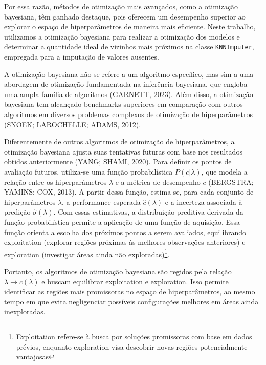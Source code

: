 \documentclass[
  12pt,
  a4paper,
]{scrreprt}
\begin{document}
\vspace{12pt}

Por essa razão, métodos de otimização mais avançados, como a otimização
bayesiana, têm ganhado destaque, pois oferecem um desempenho superior ao
explorar o espaço de hiperparâmetros de maneira mais eficiente. Neste
trabalho, utilizamos a otimização bayesiana para realizar a otimização
dos modelos e determinar a quantidade ideal de vizinhos mais próximos na
classe \texttt{KNNImputer}, empregada para a imputação de valores
ausentes.

\vspace{12pt}

A otimização bayesiana não se refere a um algoritmo específico, mas sim
a uma abordagem de otimização fundamentada na inferência bayesiana, que
engloba uma ampla família de algoritmos (GARNETT, 2023). Além disso, a
otimização bayesiana tem alcançado benchmarks superiores em comparação
com outros algoritmos em diversos problemas complexos de otimização de
hiperparâmetros (SNOEK; LAROCHELLE; ADAMS, 2012).

\vspace{12pt}

Diferentemente de outros algoritmos de otimização de hiperparâmetros, a
otimização bayesiana ajusta suas tentativas futuras com base nos
resultados obtidos anteriormente (YANG; SHAMI, 2020). Para definir os
pontos de avaliação futuros, utiliza-se uma função probabilística
\(P\left(c | \lambda \right)\), que modela a relação entre os
hiperparâmetros \(\lambda\) e a métrica de desempenho \(c\) (BERGSTRA;
YAMINS; COX, 2013). A partir dessa função, estima-se, para cada conjunto
de hiperparâmetros \(\lambda\), a performance esperada
\(\hat{c}\left(\lambda\right)\) e a incerteza associada à predição
\(\hat{\sigma}\left(\lambda\right)\). Com essas estimativas, a
distribuição preditiva derivada da função probabilística permite a
aplicação de uma função de aquisição. Essa função orienta a escolha dos
próximos pontos a serem avaliados, equilibrando exploitation (explorar
regiões próximas às melhores observações anteriores) e exploration
(investigar áreas ainda não exploradas)\footnote{Exploitation refere-se
  à busca por soluções promissoras com base em dados prévios, enquanto
  exploration visa descobrir novas regiões potencialmente vantajosas}.

\vspace{12pt}

Portanto, os algoritmos de otimização bayesiana são regidos pela relação
\(\lambda \rightarrow c\left(\lambda \right)\) e buscam equilibrar
exploitation e exploration. Isso permite identificar as regiões mais
promissoras no espaço de hiperparâmetros, ao mesmo tempo em que evita
negligenciar possíveis configurações melhores em áreas ainda
inexploradas.
\end{document}

